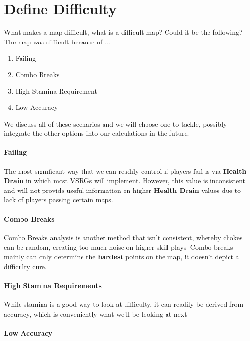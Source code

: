 \documentclass{article}
\begin{document}
\section{Define Difficulty}

	What makes a map difficult, what is a difficult map? Could it be the following?
	The map was difficult because of ...
\begin{enumerate}
	\item Failing
	\item Combo Breaks
	\item High Stamina Requirement
	\item Low Accuracy
\end{enumerate}
We discuss all of these scenarios and we will choose one to tackle, possibly integrate the other options into our calculations in the future.

\paragraph{Failing}

The most significant way that we can readily control if players fail is via \textbf{Health Drain} in which most VSRGs will implement. However, this value is inconsistent and will not provide useful information on higher \textbf{Health Drain} values due to lack of players passing certain maps.

\paragraph{Combo Breaks}

Combo Breaks analysis is another method that isn't consistent, whereby chokes can be random, creating too much noise on higher skill plays. Combo breaks mainly can only determine the \textbf{hardest} points on the map, it doesn't depict a difficulty cure.

\paragraph{High Stamina Requirements}

While stamina is a good way to look at difficulty, it can readily be derived from accuracy, which is conveniently what we'll be looking at next

\paragraph{Low Accuracy}
\end{document}

